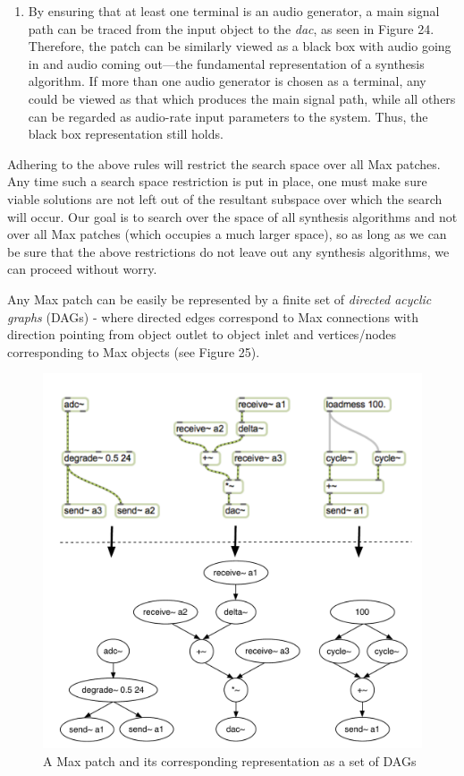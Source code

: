 \documentclass[12pt]{report} 	%
\numberwithin{figure}{chapter}
\numberwithin{table}{chapter}
\numberwithin{equation}{chapter}
\begin{document}
\begin{flushleft}
\begin{enumerate}
\item By ensuring that at least one terminal is an audio generator, a main signal path can be traced from the input object to the \textit{dac\texttildelow{}}, as seen in Figure 24. Therefore, the patch can be similarly viewed as a black box with audio going in and audio coming out---the fundamental representation of a synthesis algorithm. If more than one audio generator is chosen as a terminal, any could be viewed as that which produces the main signal path, while all others can be regarded as audio-rate input parameters to the system. Thus, the black box representation still holds.
\end{enumerate}

Adhering to the above rules will restrict the search space over all Max patches. Any time such a search space restriction is put in place, one must make sure viable solutions are not left out of the resultant subspace over which the search will occur. Our goal is to search over the space of all synthesis algorithms and not over all Max patches (which occupies a much larger space), so as long as we can be sure that the above restrictions do not leave out any synthesis algorithms, we can proceed without worry.

Any Max patch can be easily be represented by a finite set of \textit{directed acyclic graphs} (DAGs) - where directed edges correspond to Max connections with direction pointing from object outlet to object inlet and vertices/nodes corresponding to Max objects (see Figure 25).
\begin{figure}[h!]
\begin{center}
\includegraphics[scale=0.7]{MaxDAGs}
\caption[A Max patch as a set of DAGs]{A Max patch and its corresponding representation as a set of DAGs}
\end{center}
\end{figure}


\end{flushleft}
\end{document}
